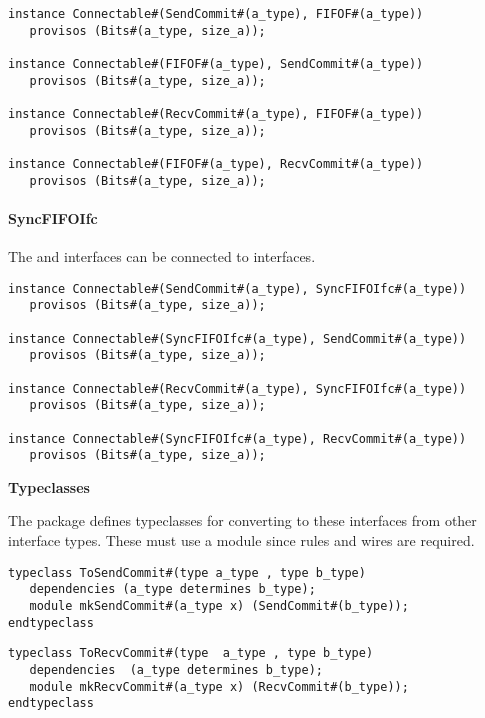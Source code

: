 \begin{verbatim}
instance Connectable#(SendCommit#(a_type), FIFOF#(a_type))
   provisos (Bits#(a_type, size_a));

instance Connectable#(FIFOF#(a_type), SendCommit#(a_type))
   provisos (Bits#(a_type, size_a));

instance Connectable#(RecvCommit#(a_type), FIFOF#(a_type))
   provisos (Bits#(a_type, size_a));

instance Connectable#(FIFOF#(a_type), RecvCommit#(a_type))
   provisos (Bits#(a_type, size_a));
\end{verbatim}

\paragraph{SyncFIFOIfc}
The  and  interfaces can be connected to
 interfaces.
\begin{verbatim}
instance Connectable#(SendCommit#(a_type), SyncFIFOIfc#(a_type))
   provisos (Bits#(a_type, size_a));

instance Connectable#(SyncFIFOIfc#(a_type), SendCommit#(a_type))
   provisos (Bits#(a_type, size_a));

instance Connectable#(RecvCommit#(a_type), SyncFIFOIfc#(a_type))
   provisos (Bits#(a_type, size_a));

instance Connectable#(SyncFIFOIfc#(a_type), RecvCommit#(a_type))
   provisos (Bits#(a_type, size_a));
\end{verbatim}





{\bf Typeclasses}

The  package defines typeclasses for converting to these
interfaces from other interface types.  These must use a module since
rules and wires are required.

\begin{verbatim}
typeclass ToSendCommit#(type a_type , type b_type)
   dependencies (a_type determines b_type);
   module mkSendCommit#(a_type x) (SendCommit#(b_type));
endtypeclass
\end{verbatim}

\begin{verbatim}
typeclass ToRecvCommit#(type  a_type , type b_type)
   dependencies  (a_type determines b_type);
   module mkRecvCommit#(a_type x) (RecvCommit#(b_type));
endtypeclass
\end{verbatim}

